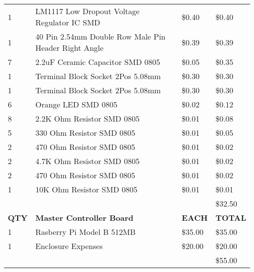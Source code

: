 \begin{table}[H]
{\begin{tabular}{llll}
1            & LM1117 Low Dropout Voltage Regulator IC SMD          & \$0.40        & \$0.40         \\
1            & 40 Pin 2.54mm Double Row Male Pin Header Right Angle & \$0.39        & \$0.39         \\
7            & 2.2uF Ceramic Capacitor SMD 0805                     & \$0.05        & \$0.35         \\
1            & Terminal Block Socket 2Pos 5.08mm                    & \$0.30        & \$0.30         \\
1            & Terminal Block Socket 2Pos 5.08mm                    & \$0.30        & \$0.30         \\
6            & Orange LED SMD 0805                                  & \$0.02        & \$0.12         \\
8            & 2.2K Ohm Resistor SMD 0805                           & \$0.01        & \$0.08         \\
5            & 330 Ohm Resistor SMD 0805                            & \$0.01        & \$0.05         \\
2            & 470 Ohm Resistor SMD 0805                            & \$0.01        & \$0.02         \\
2            & 4.7K Ohm Resistor SMD 0805                           & \$0.01        & \$0.02         \\
2            & 470 Ohm Resistor SMD 0805                            & \$0.01        & \$0.02         \\
1            & 10K Ohm Resistor SMD 0805                            & \$0.01        & \$0.01         \\
             &                                                      &               & \$32.50        \\  \hline \hline
\textbf{QTY} & \textbf{Master Controller Board}                     & \textbf{EACH} & \textbf{TOTAL} \\
1            & Rasberry Pi Model B 512MB                            & \$35.00       & \$35.00        \\
1            & Enclosure Expenses                                   & \$20.00       & \$20.00        \\
             &                                                      &               & \$55.00        \\  \hline
\end{tabular}}
\end{table}

